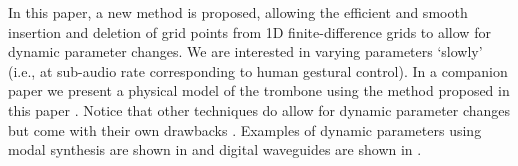 In this paper, a new method is proposed, allowing the efficient and smooth insertion and deletion of grid points from 1D finite-difference grids to allow for dynamic parameter changes. We are interested in varying parameters `slowly' (i.e., at sub-audio rate corresponding to human gestural control). In a companion paper we present a physical model of the trombone using the method proposed in this paper \cite{Willemsen2021}. Notice that other techniques do allow for dynamic parameter changes but come with their own drawbacks \cite{bilbao2009}. Examples of dynamic parameters using modal synthesis \cite{morrison1993mosaic} are shown in \cite{Mehes2016, Willemsen2017} and digital waveguides \cite{Smith1992} are shown in \cite{Michon2014}.





